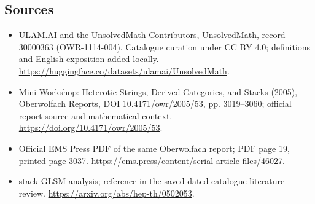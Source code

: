 \documentclass[11pt]{article}
\begin{document}
\subsection{Sources}
\begin{itemize}
\item[\hypertarget{source:30000363:1}{S1}] ULAM.AI and the UnsolvedMath Contributors, UnsolvedMath, record 30000363 (OWR-1114-004). Catalogue curation under CC BY 4.0; definitions and English exposition added locally.
\url{https://huggingface.co/datasets/ulamai/UnsolvedMath}.
\item[\hypertarget{source:30000363:2}{S2}] Mini-Workshop: Heterotic Strings, Derived Categories, and Stacks (2005), Oberwolfach Reports, DOI 10.4171/owr/2005/53, pp. 3019--3060; official report source and mathematical context.
\url{https://doi.org/10.4171/owr/2005/53}.
\item[\hypertarget{source:30000363:3}{S3}] Official EMS Press PDF of the same Oberwolfach report; PDF page 19, printed page 3037.
\url{https://ems.press/content/serial-article-files/46027}.
\item[\hypertarget{source:30000363:4}{S4}] stack GLSM analysis; reference in the saved dated catalogue literature review.
\url{https://arxiv.org/abs/hep-th/0502053}.
\end{itemize}
\label{end:30000363}
\end{document}
